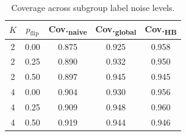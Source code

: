 \documentclass[11pt,a4paper]{article}
\begin{document}
\begin{table}[h]
\centering
\small
\caption{Coverage across subgroup label noise levels.}
\label{tab:robustness}
\begin{tabular}{@{}ccccc@{}}
\toprule
$K$ & $p_{\text{flip}}$ & Cov.\textsubscript{naive} & Cov.\textsubscript{global} & Cov.\textsubscript{HB} \\
\midrule
2 & 0.00 & 0.875 & 0.925 & 0.958 \\
2 & 0.25 & 0.890 & 0.932 & 0.950 \\
2 & 0.50 & 0.897 & 0.945 & 0.945 \\
4 & 0.00 & 0.904 & 0.930 & 0.956 \\
4 & 0.25 & 0.909 & 0.948 & 0.960 \\
4 & 0.50 & 0.919 & 0.944 & 0.946 \\
\bottomrule
\end{tabular}
\end{table}
\end{document}
